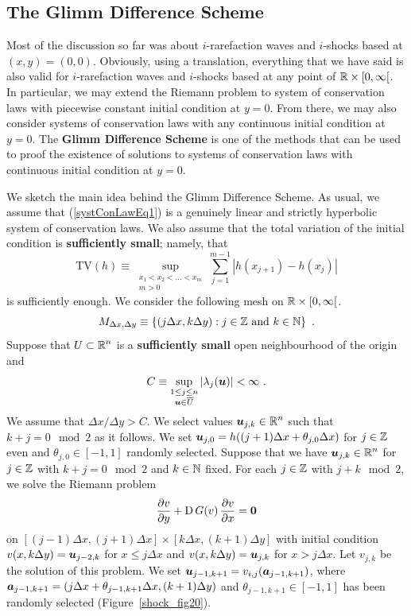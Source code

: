 \subsection{The Glimm Difference Scheme}

Most of the discussion so far was about $i$-rarefaction waves and
$i$-shocks based at $(x,y) = (0,0)$.  Obviously, using a translation,
everything that we have said is also valid for $i$-rarefaction waves
and $i$-shocks based at any point of $\mathbb{R}\times [0,\infty[$.
In particular, we may extend the Riemann problem to system of
conservation laws with piecewise constant initial condition at $y=0$.
From there, we may also consider systems of conservation laws with any
continuous initial condition at $y=0$.  The
{\bfseries Glimm Difference Scheme} is one of the methods that can be used to
proof the existence of solutions to systems of conservation laws with
continuous initial condition at $y=0$.

We sketch the main idea behind the Glimm Difference Scheme.  As usual,
we assume that (\ref{systConLawEq1}) is a genuinely linear and
strictly hyperbolic system of conservation laws.  We also assume that
the total variation of the initial condition is {\bfseries sufficiently small};
namely, that
\[
  \text{TV}(h) \equiv
\sup_{\substack{x_1 < x_2 < \ldots < x_m\\ m >0}} \sum_{j=1}^{m-1} \left|
h(x_{j+1}) - h(x_j) \right|
\]
is sufficiently enough.  We consider the following mesh on
$\mathbb{R}\times [0,\infty[$.
\[
  M_{\Delta x, \Delta y} \equiv \left\{ (j \Delta x , k \Delta y) :
    j \in \mathbb{Z} \ \text{and} \ k \in \mathbb{N} \right\} \ .
\]
Suppose that $\displaystyle U \subset \mathbb{R}^n$ is a {\bfseries sufficiently small}
open neighbourhood of the origin and
\[
  C \equiv \sup_{\substack{1 \leq j \leq n\\
    {\bm{u}} \in \overline{U}}} \left| \lambda_j({\bm{u}}) \right|
< \infty \ .
\]
We assume that $\Delta x / \Delta y > C$.  We select values
$\displaystyle {\bm{u}}_{j,k} \in \mathbb{R}^n$ such that
$k+j = 0 \mod{2}$ as it follows.
We set ${\bm{u}}_{j,0} = h((j+1)\Delta x + \theta_{j,0} \Delta x)$ for
$j \in \mathbb{Z}$ even and $\theta_{j,0} \in [-1,1]$ randomly selected.  Suppose
that we have $\displaystyle {\bm{u}}_{j,k} \in \mathbb{R}^n$
for $j\in \mathbb{Z}$ with $k+j =0 \mod{2}$ and $k\in \mathbb{N}$ fixed.  For each
$j \in \mathbb{Z}$ with $j+k \mod{2}$, we solve the Riemann problem
\[
  \frac{\partial{v}}{\partial y} + \operatorname{D} G(v) \, \frac{\partial{v}}{\partial x} = {\bm{0}}
\]
on $[(j-1)\Delta x, (j+1)\Delta x]\times [k\Delta x,(k+1)\Delta y]$
with initial condition
$v(x, k\Delta y) = {\bm{u}}_{j-2,k}$ for $ x \leq j \Delta x$
and $v(x, k\Delta y) = {\bm{u}}_{j,k}$ for $ x > j \Delta x$.
Let $v_{j,k}$ be the solution of this problem.  We set
${\bm{u}}_{j-1,k+1} = v_{i,j}({\bm{a}}_{j-1,k+1})$, where
${\bm{a}}_{j-1,k+1} = (j\Delta x + \theta_{j-1,k+1} \Delta x, (k+1) \Delta y)$
and $\theta_{j-1,k+1} \in [-1,1]$ has been randomly selected
(Figure~\ref{shock_fig20}).

